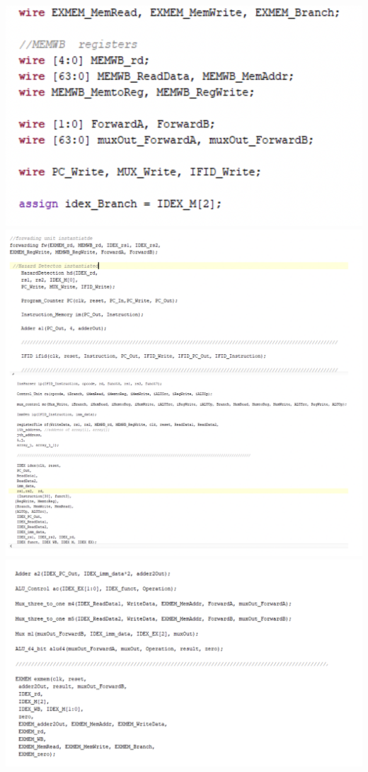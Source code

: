 \documentclass[a4paper, 12pt]{report}
\begin{document}
\\\includegraphics[scale = 0.5]{pipe top 3.png}
\\\includegraphics[scale = 0.5]{pipe top 4.png}
\\\includegraphics[scale = 0.5]{pipe top 5.png}
\end{document}
